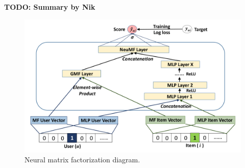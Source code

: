 \textbf{TODO: Summary by Nik}


\begin{figure}[h]
    \centering
    \includegraphics[width=0.8\linewidth]{images/neumf.png}
    \caption{Neural matrix factorization diagram.}
    \label{fig:neumf}
\end{figure}


